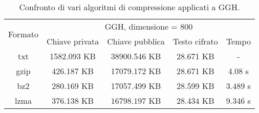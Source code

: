 \begin{table}[H]
    \centering
    \begin{tabular}{|c|c|c|c|c|}
    \hline
    \multirow{2}{*}{Formato} & \multicolumn{4}{c|}{GGH, dimensione = 800} \\ \cline{2-5} 
     & Chiave privata & Chiave pubblica & Testo cifrato & Tempo \\ \hline
    txt & 1582.093 KB& 38900.546 KB& 28.671 KB& -\\ \hline
    gzip & 426.187 KB& 17079.172 KB& 28.671 KB& 4.08 s\\ \hline
    bz2 & $\mathbf{280.169}$ KB& 17057.499 KB& 28.599 KB& $\mathbf{3.489}$ s\\ \hline
    lzma & 376.138 KB& $\mathbf{16798.197}$ KB& $\mathbf{28.434}$ KB& 9.346 s\\ \hline
    \end{tabular}
    \caption{Confronto di vari algoritmi di compressione applicati a GGH.}
    \label{tab:GGH_compresso}
\end{table}


